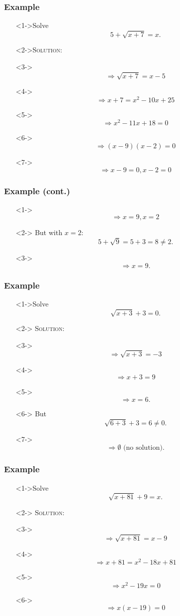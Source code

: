 \documentclass[handout]{beamer}
\begin{document}
\begin{frame}
	\frametitle{Example} 
	\begin{enumerate}
		\item[]<1->Solve 
		\[
			5+\sqrt{x+7}=x. 
		\]
		\item[]<2->\textsc{Solution:} 
		\item[]<3-> \[ \Rightarrow \sqrt{x+7}=x-5 \] 
		\item[]<4-> \[ \Rightarrow x+7=x^{2}-10x+25 \] 
		\item[]<5-> \[ \Rightarrow x^{2}-11x+18=0 \] 
		\item[]<6-> \[ \Rightarrow (x-9)(x-2)=0 \] 
		\item[]<7-> \[ \Rightarrow x-9=0, x-2=0 \] 
	\end{enumerate}
\end{frame}

\begin{frame}
	\frametitle{Example (cont.)} 
	\begin{enumerate} 
		\item[]<1-> \[ \Rightarrow x=9, x=2 \] 
		\item[]<2-> But with $x=2:$ 
		\[
			5+\sqrt{9}=5+3=8 \neq 2. 
		\]
		\item[]<3-> \[ \Rightarrow x=9. \] 
	\end{enumerate}
\end{frame}

\begin{frame}
	\frametitle{Example} 
	\begin{enumerate}
		\item[]<1->Solve 
		\[
			\sqrt{x+3}+3=0. 
		\]
		\item[]<2-> \textsc{Solution:} 
		\item[]<3-> \[ \Rightarrow \sqrt{x+3}=-3 \]
		\item[]<4-> \[ \Rightarrow x+3=9 \] 
		\item[]<5-> \[ \Rightarrow x=6. \]
		\item[]<6-> But 
		\[
			\sqrt{6+3}+3=6 \neq 0. 
		\]
		\item[]<7-> 
		\[
			\Rightarrow \emptyset \text{ (no solution)}.  
		\]
	\end{enumerate}
\end{frame}

\begin{frame}
	\frametitle{Example}
	\begin{enumerate}
		\item[]<1->Solve 
		\[
			\sqrt{x+81}+9=x. 
		\]
		\item[]<2-> \textsc{Solution:} 
		\item[]<3-> \[ \Rightarrow \sqrt{x+81}=x-9 \] 
		\item[]<4-> \[ \Rightarrow x+81=x^{2}-18x+81 \] 
		\item[]<5-> \[ \Rightarrow x^{2}-19x=0 \] 
		\item[]<6-> \[ \Rightarrow x(x-19)=0 \] 
	\end{enumerate}
\end{frame}
\end{document}

